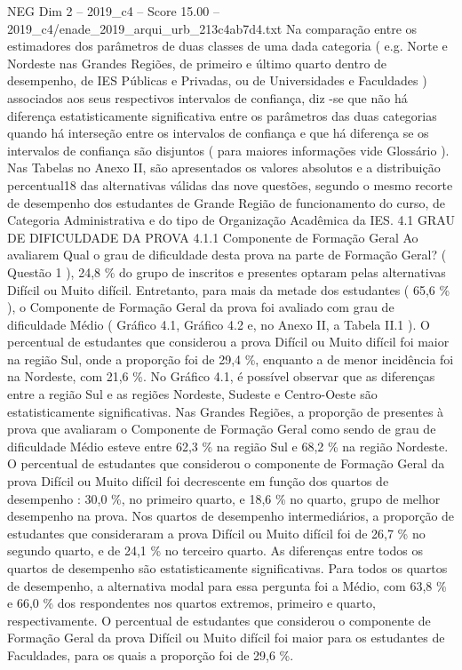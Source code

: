 \begin{textsample}{NEG Dim 2 – 2019\_c4 – Score 15.00 – 2019\_c4/enade\_2019\_arqui\_urb\_213c4ab7d4.txt}
Na comparação entre os estimadores dos parâmetros de duas classes de uma dada categoria ( e.g.
Norte e Nordeste nas Grandes Regiões, de primeiro e último quarto dentro de desempenho, de IES Públicas e Privadas, ou de Universidades e Faculdades ) associados aos seus respectivos intervalos de confiança, diz -se que não há diferença estatisticamente significativa entre os parâmetros das duas categorias quando há interseção entre os intervalos de confiança e que há diferença se os intervalos de confiança são disjuntos ( para maiores informações vide Glossário ).
Nas Tabelas no Anexo II, são apresentados os valores absolutos e a distribuição percentual18 das alternativas válidas das nove questões, segundo o mesmo recorte de desempenho dos estudantes de Grande Região de funcionamento do curso, de Categoria Administrativa e do tipo de Organização Acadêmica da IES. 4.1 GRAU DE DIFICULDADE DA PROVA 4.1.1 Componente de Formação Geral Ao avaliarem Qual o grau de dificuldade desta prova na parte de Formação Geral? ( Questão 1 ), 24,8 \% do grupo de inscritos e presentes optaram pelas alternativas Difícil ou Muito difícil.
Entretanto, para mais da metade dos estudantes ( 65,6 \% ), o Componente de Formação Geral da prova foi avaliado com grau de dificuldade Médio ( Gráfico 4.1, Gráfico 4.2 e, no Anexo II, a Tabela II.1 ).
O percentual de estudantes que considerou a prova Difícil ou Muito difícil foi maior na região Sul, onde a proporção foi de 29,4 \%, enquanto a de menor incidência foi na Nordeste, com 21,6 \%.
No Gráfico 4.1, é possível observar que as diferenças entre a região Sul e as regiões Nordeste, Sudeste e Centro-Oeste são estatisticamente significativas.
Nas Grandes Regiões, a proporção de presentes à prova que avaliaram o Componente de Formação Geral como sendo de grau de dificuldade Médio esteve entre 62,3 \% na região Sul e 68,2 \% na região Nordeste.
O percentual de estudantes que considerou o componente de Formação Geral da prova Difícil ou Muito difícil foi decrescente em função dos quartos de desempenho : 30,0 \%, no primeiro quarto, e 18,6 \% no quarto, grupo de melhor desempenho na prova.
Nos quartos de desempenho intermediários, a proporção de estudantes que consideraram a prova Difícil ou Muito difícil foi de 26,7 \% no segundo quarto, e de 24,1 \% no terceiro quarto.
As diferenças entre todos os quartos de desempenho são estatisticamente significativas.
Para todos os quartos de desempenho, a alternativa modal para essa pergunta foi a Médio, com 63,8 \% e 66,0 \% dos respondentes nos quartos extremos, primeiro e quarto, respectivamente.
O percentual de estudantes que considerou o componente de Formação Geral da prova Difícil ou Muito difícil foi maior para os estudantes de Faculdades, para os quais a proporção foi de 29,6 \%.

\end{textsample}
